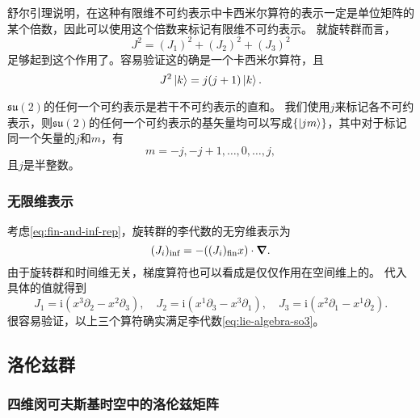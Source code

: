 \documentclass[hyperref, UTF8, a4paper]{ctexart}
\newcommand*{\ii}{\mathrm{i}}
\begin{document}
舒尔引理说明，在这种有限维不可约表示中卡西米尔算符的表示一定是单位矩阵的某个倍数，因此可以使用这个倍数来标记有限维不可约表示。
就旋转群而言，
\begin{equation}
    J^2 = (J_1)^2 + (J_2)^2 + (J_3)^2
\end{equation}
足够起到这个作用了。容易验证这的确是一个卡西米尔算符，且
\begin{equation}
    J^2 \ket{k} = j (j+1) \ket{k}.
\end{equation}

$\mathfrak{su}(2)$的任何一个可约表示是若干不可约表示的直和。
我们使用$j$来标记各不可约表示，则$\mathfrak{su}(2)$的任何一个可约表示的基矢量均可以写成$\{\ket{jm}\}$，其中对于标记同一个矢量的$j$和$m$，有
\[
    m = -j, -j+1, \ldots, 0, \ldots, j,
\]
且$j$是半整数。

\subsubsection{无限维表示}

考虑\eqref{eq:fin-and-inf-rep}，旋转群的李代数的无穷维表示为
\[
    (J_i)_\text{inf} = - ((J_i)_\text{fin} x) \cdot \grad.
\]
由于旋转群和时间维无关，梯度算符也可以看成是仅仅作用在空间维上的。
代入具体的值就得到
\begin{equation}
    J_1 = \ii (x^3 \partial_2 - x^2 \partial_3), \quad J_2 = \ii (x^1 \partial_3 - x^3 \partial_1), \quad
    J_3 = \ii (x^2 \partial_1 - x^1 \partial_2).
    \label{eq:rotation-inf-rep}
\end{equation}
很容易验证，以上三个算符确实满足李代数\eqref{eq:lie-algebra-so3}。

\subsection{洛伦兹群}

\subsubsection{四维闵可夫斯基时空中的洛伦兹矩阵}
\end{document}
